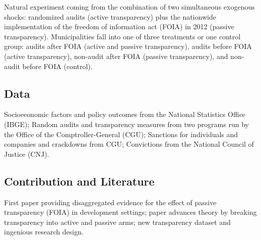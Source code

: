 \documentclass[]{article}
\begin{document}
Natural experiment coming from the combination of two simultaneous
exogenous shocks: randomized audits (active transparency) plus the
nationwide implementation of the freedom of information act (FOIA) in
2012 (passive transparency). Municipalities fall into one of three
treatments or one control group: audits after FOIA (active and passive
transparency), audits before FOIA (active transparency), non-audit after
FOIA (passive transparency), and non-audit before FOIA (control).

\hypertarget{data}{%
\subsection{Data}\label{data}}

Socioeconomic factors and policy outcomes from the National Statistics
Office (IBGE); Random audits and transparency measures from two programs
run by the Office of the Comptroller-General (CGU); Sanctions for
individuals and companies and crackdowns from CGU; Convictions from the
National Council of Justice (CNJ).

\hypertarget{contribution-and-literature}{%
\subsection{Contribution and
Literature}\label{contribution-and-literature}}

First paper providing disaggregated evidence for the effect of passive
transparency (FOIA) in development settings; paper advances theory by
breaking transparency into active and passive arms; new transparency
dataset and ingenious research design.
\end{document}
